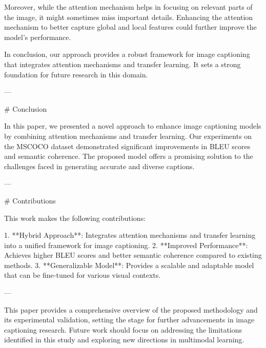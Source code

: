 Moreover, while the attention mechanism helps in focusing on relevant parts of the image, it might sometimes miss important details. Enhancing the attention mechanism to better capture global and local features could further improve the model’s performance.

In conclusion, our approach provides a robust framework for image captioning that integrates attention mechanisms and transfer learning. It sets a strong foundation for future research in this domain.

---

# Conclusion

In this paper, we presented a novel approach to enhance image captioning models by combining attention mechanisms and transfer learning. Our experiments on the MSCOCO dataset demonstrated significant improvements in BLEU scores and semantic coherence. The proposed model offers a promising solution to the challenges faced in generating accurate and diverse captions.

---

# Contributions

This work makes the following contributions:

1. **Hybrid Approach**: Integrates attention mechanisms and transfer learning into a unified framework for image captioning.
2. **Improved Performance**: Achieves higher BLEU scores and better semantic coherence compared to existing methods.
3. **Generalizable Model**: Provides a scalable and adaptable model that can be fine-tuned for various visual contexts.

---

This paper provides a comprehensive overview of the proposed methodology and its experimental validation, setting the stage for further advancements in image captioning research. Future work should focus on addressing the limitations identified in this study and exploring new directions in multimodal learning.

\newpage



